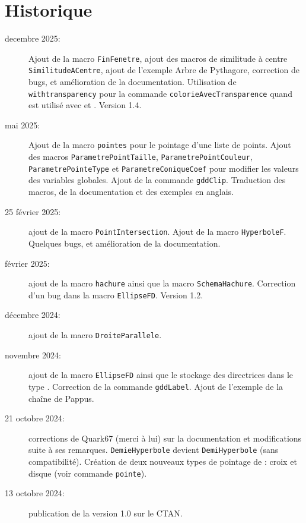 \documentclass[a4paper,french]{article}
\begin{document}
\newpage
\section{Historique}
\begin{description}
  \item[decembre 2025:] Ajout de la macro \lstinline+FinFenetre+, ajout des
  macros de similitude à centre \lstinline+SimilitudeACentre+, ajout de
  l’exemple \og{}Arbre de Pythagore\fg{}, correction de
  bugs, et amélioration de la documentation. Utilisation de \lstinline+withtransparency+
  pour la commande \lstinline+colorieAvecTransparence+ quand \mpgeomdd est
  utilisé avec  et . Version 1.4. 
  \item[mai 2025:] Ajout de la macro \lstinline+pointes+ pour le pointage d’une
  liste de points. Ajout des macros \lstinline+ParametrePointTaille+,
  \lstinline+ParametrePointCouleur+, \lstinline+ParametrePointeType+ et
  \lstinline+ParametreConiqueCoef+ pour modifier les valeurs des variables
  globales. Ajout de la commande \lstinline|gddClip|. Traduction des macros, de
  la documentation et des exemples en anglais. 
  \item[25 février 2025:] ajout de la macro \lstinline|PointIntersection|. Ajout
  de la macro \lstinline+HyperboleF+. Quelques bugs, et amélioration de la
  documentation. 
  \item[février 2025:] ajout de la macro \lstinline+hachure+ ainsi que la macro
  \lstinline+SchemaHachure+. Correction d’un bug dans la macro
  \lstinline+EllipseFD+. Version 1.2.
  \item[décembre 2024:] ajout de la macro \lstinline+DroiteParallele+. 
  \item[novembre 2024:] ajout de la macro \lstinline+EllipseFD+ ainsi que le
  stockage des directrices dans le type . Correction de la
  commande \lstinline+gddLabel+. Ajout de l’exemple de la chaîne de Pappus.  
  \item[21 octobre 2024:] corrections de Quark67 (merci à lui) sur la
  documentation et modifications suite à ses remarques.
  \lstinline+DemieHyperbole+ devient 
  \lstinline+DemiHyperbole+ (sans compatibilité). Création de deux nouveaux
  types 
  de pointage de  : croix et disque (voir commande \lstinline+pointe+).
  \item[13 octobre 2024:] publication de la version 1.0 sur le CTAN.  
\end{description}

\printbibliography
{}%
\printindex
{}%
\end{document}
